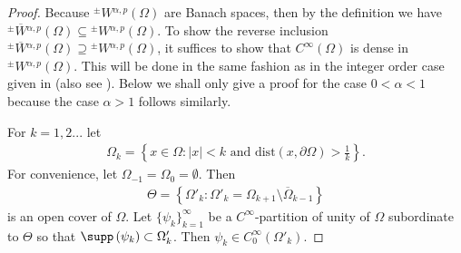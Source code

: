 \documentclass[leqno,final]{siamltex}
\numberwithin{equation}{section}
\renewcommand{\(}{\bigl(}
\renewcommand{\)}{\bigr)}
\begin{document}
    \begin{proof}
        Because ${^{\pm}}{W}{^{\alpha,p}}(\Omega)$ are Banach spaces, then by the definition we have  ${^{\pm}}{\overline{W}}{^{\alpha,p}}(\Omega) \subseteq {^{\pm}}{W}{^{\alpha,p}}(\Omega)$. To show 
        the reverse inclusion ${^{\pm}}{\overline{W}}{^{\alpha,p}}(\Omega) \supseteq {^{\pm}}{W}{^{\alpha,p}}(\Omega)$, it suffices to show that $C^{\infty}(\Omega)$ is dense in ${^{\pm}}{W}{^{\alpha , p}}(\Omega)$.  This will be done in the same fashion as in the 
        integer order case given in \cite{Meyers} (also see \cite{Adams, Evans}). Below we shall only give a proof for 
        the case $0<\alpha< 1$ because the case $\alpha >1$ follows similarly.
        
        For $k = 1,2...$ let 
        \begin{align*}
            \Omega_{k} = \left\{x \in \Omega : |x| < k \text{ and } \text{dist}(x , \partial \Omega) > \frac{1}{k} \right\}.
        \end{align*}
        For convenience, let $\Omega_{-1} = \Omega _0 = \emptyset$. Then 
        \begin{align*}
            \Theta = \left\{ \Omega'_{k} : \Omega'_{k} = \Omega_{k+1} \setminus \overline{\Omega}_{k-1} \right\}
        \end{align*}
        is an open cover of $\Omega$. Let $\{\psi_k\}_{k =1}^{\infty}$ be a $C^{\infty}$-partition of unity of $\Omega$ subordinate to $\Theta$ so that  $\supp\left( \psi_{k} \right) \subset \Omega'_{k}$. Then $\psi_{k} \in C^{\infty}_{0} \left(\Omega'_{k} \right)$. 


\end{proof}
\end{document}

